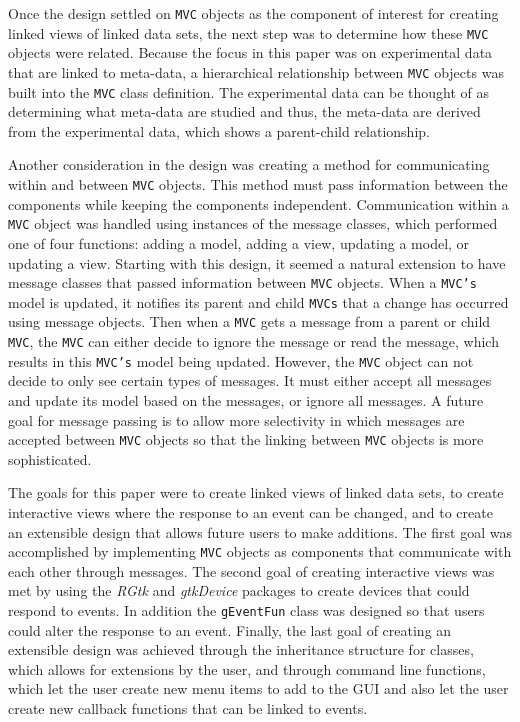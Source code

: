 \documentclass{article}[11pt]
\newcommand{\Robject}[1]{{\texttt{#1}}}
\newcommand{\Rpackage}[1]{{\textit{#1}}}
\newcommand{\Rclass}[1]{\texttt{#1}}
\begin{document}
Once the design settled on \Robject{MVC} objects as the component of interest
for creating linked views of linked data sets, the next step was to determine
how these \Robject{MVC} objects were related.  Because the focus in this paper
was on experimental data that are linked to meta-data, a hierarchical
relationship between \Robject{MVC} objects was built into the \Rclass{MVC}
class definition.  The experimental data can be thought of as determining what
meta-data are studied and thus, the meta-data are derived from the
experimental data, which shows a parent-child relationship.  
 
Another consideration in the design was creating a method for communicating
within and between \Robject{MVC} objects.  This method must pass information
between the components while keeping the components independent.
Communication within a \Robject{MVC} object was handled using instances of the
message classes, which performed one of four functions: adding a model, adding
a view, updating a model, or updating a view.  Starting with this design, it
seemed a natural extension to have message classes that passed information
between \Robject{MVC} objects.  When a \Robject{MVC's} model is updated, it
notifies its parent and child \Robject{MVCs} that a change has occurred using
message objects.  Then when a \Robject{MVC} gets a message from a parent or
child \Robject{MVC}, the \Robject{MVC} can either decide to ignore the message
or read the message, which results in this \Robject{MVC's} model being
updated.  However, the \Robject{MVC} object can not decide to only see certain
types of messages.  It must either accept all messages and update its model
based on the messages, or ignore all messages.  A future goal for message
passing is to allow more selectivity in which messages are accepted between
\Robject{MVC} objects so that the linking between \Robject{MVC} objects is
more sophisticated. 

The goals for this paper were to create linked views of linked data sets, to
create interactive views where the response to an event can be changed, and to
create an extensible design that allows future users to make additions.
The first goal was accomplished by implementing \Robject{MVC} objects as
components that communicate with each other through messages.  The second goal
of creating interactive views was met by using the \Rpackage{RGtk} and
\Rpackage{gtkDevice} packages to create devices that could respond to events.
In addition the \Rclass{gEventFun} class was designed so that users could
alter the response to an event.  Finally, the last goal of creating an
extensible design was achieved through the inheritance structure for classes,
which allows for extensions by the user, and through command line functions,
which let the user create new menu items to add to the GUI and also let the
user create new callback functions that can be linked to events. 
\end{document}
